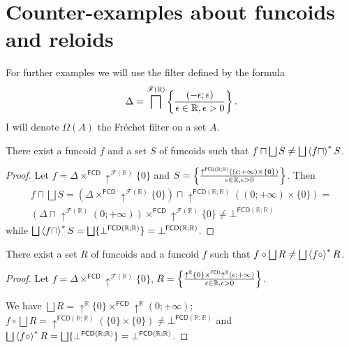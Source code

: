
\chapter{Counter-examples about funcoids and reloids}

For further examples we will use the filter defined by the formula
\[
\Delta=\bigsqcap^{\mathscr{F}(\mathbb{R})}\left\{ \frac{(-\epsilon;\epsilon)}{\epsilon\in\mathbb{R},\epsilon>0}\right\}.
\]
I will denote $\Omega(A)$ the Fr\'echet filter on a set $A$.
\begin{example}
There exist a funcoid $f$ and a set $S$ of funcoids such that $f\sqcap\bigsqcup S\neq\bigsqcup\left\langle f\sqcap\right\rangle ^{\ast}S$.\end{example}
\begin{proof}
Let $f=\Delta\times^{\mathsf{FCD}}\uparrow^{\mathscr{F}(\mathbb{R})}\{0\}$
and $S=\left\{ \frac{\uparrow^{\mathsf{FCD}(\mathbb{R};\mathbb{R})}((\epsilon;+\infty)\times\{0\})}{\epsilon\in\mathbb{R},\epsilon>0}\right\}$.
Then
\begin{multline*}
f\sqcap\bigsqcup S=(\Delta\times^{\mathsf{FCD}}\uparrow^{\mathscr{F}(\mathbb{R})}\{0\})\sqcap\uparrow^{\mathsf{FCD}(\mathbb{R};\mathbb{R})}((0;+\infty)\times\{0\})=\\
(\Delta\sqcap\uparrow^{\mathscr{F}(\mathbb{R})}(0;+\infty))\times^{\mathsf{FCD}}\uparrow^{\mathscr{F}(\mathbb{R})}\{0\}\ne\bot^{\mathsf{FCD}(\mathbb{R};\mathbb{R})}
\end{multline*}
while $\bigsqcup\left\langle f\sqcap\right\rangle ^{\ast}S=\bigsqcup\{\bot^{\mathsf{FCD}(\mathbb{R};\mathbb{R})}\}=\bot^{\mathsf{FCD}(\mathbb{R};\mathbb{R})}$.\end{proof}
\begin{example}
There exist a set $R$ of funcoids and a funcoid $f$ such that $f\circ\bigsqcup R\neq\bigsqcup\left\langle f\circ\right\rangle ^{\ast}R$.\end{example}
\begin{proof}
Let $f=\Delta\times^{\mathsf{FCD}}\uparrow^{\mathscr{F}(\mathbb{R})}\{0\}$,
$R=\left\{ \frac{\uparrow^{\mathbb{R}}\{0\}\times^{\mathsf{FCD}}\uparrow^{\mathbb{R}}(\epsilon;+\infty)}{\epsilon\in\mathbb{R},\epsilon>0}\right\}$.

We have $\bigsqcup R=\uparrow^{\mathbb{R}}\{0\}\times^{\mathsf{FCD}}\uparrow^{\mathbb{R}}(0;+\infty)$;
$f\circ\bigsqcup R=\uparrow^{\mathsf{FCD}(\mathbb{R};\mathbb{R})}(\{0\}\times\{0\})\ne\bot^{\mathsf{FCD}(\mathbb{R};\mathbb{R})}$
and $\bigsqcup\left\langle f\circ\right\rangle ^{\ast}R=\bigsqcup\{\bot^{\mathsf{FCD}(\mathbb{R};\mathbb{R})}\}=\bot^{\mathsf{FCD}(\mathbb{R};\mathbb{R})}$.\end{proof}
